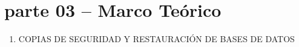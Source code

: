 \section{parte 03 –  Marco Teórico} 

\begin{enumerate}[1.]
	\item COPIAS DE SEGURIDAD Y RESTAURACIÓN DE BASES DE DATOS
	

	
	
	

\end{enumerate} 

